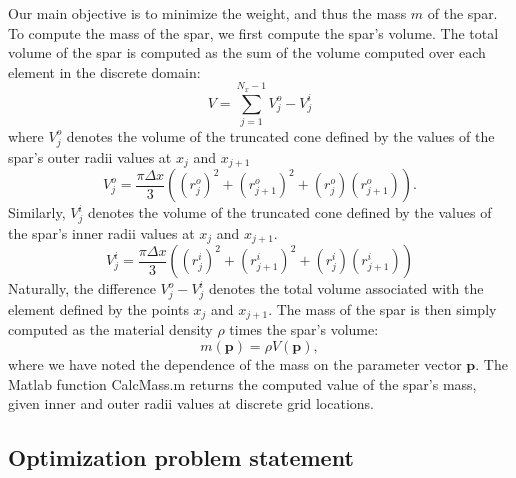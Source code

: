 \documentclass[11pt]{article}
\newcommand{\bs}[1] {\boldsymbol{#1}}
\begin{document}
Our main objective is to minimize the weight, and thus
the mass $m$ of the spar. To compute the mass of the
spar, we first compute the spar's volume. The total volume
of the spar is computed as the sum of the volume computed
over each element in the discrete domain:
\begin{equation}
V = \sum^{N_x-1}_{j=1} V^o_j - V^i_j
\end{equation}
where $V^o_j$ denotes the volume of the truncated cone
defined by the values of the spar's outer
radii values at $x_j$ and $x_{j+1}$
\begin{equation}
V^o_j = \frac{\pi \Delta x}{3} ((r^o_j)^2 + (r^o_{j+1})^2 + (r^o_j)(r^o_{j+1})).
\end{equation}
Similarly, $V^i_j$ denotes the volume of the truncated cone
defined by the values of the spar's inner
radii values at $x_j$ and $x_{j+1}$.
\begin{equation}
V^i_j = \frac{\pi \Delta x}{3} ((r^i_j)^2 + (r^i_{j+1})^2 + (r^i_j) (r^i_{j+1}))
\end{equation}
Naturally, the difference $V^o_j-V^i_j$ denotes the
total volume associated with the element defined
by the points $x_j$ and $x_{j+1}$.
The mass of the spar is then simply computed
as the material density $\rho$ times the spar's volume:
\begin{equation}
m(\bs{p}) =  \rho V(\bs{p}),
\end{equation}
where we have noted the dependence of the mass on the parameter
vector $\bs{p}$. The Matlab
function CalcMass.m returns the computed value
of the spar's mass, given inner and outer radii
values at discrete grid locations.

\subsection{Optimization problem statement}
\end{document}
